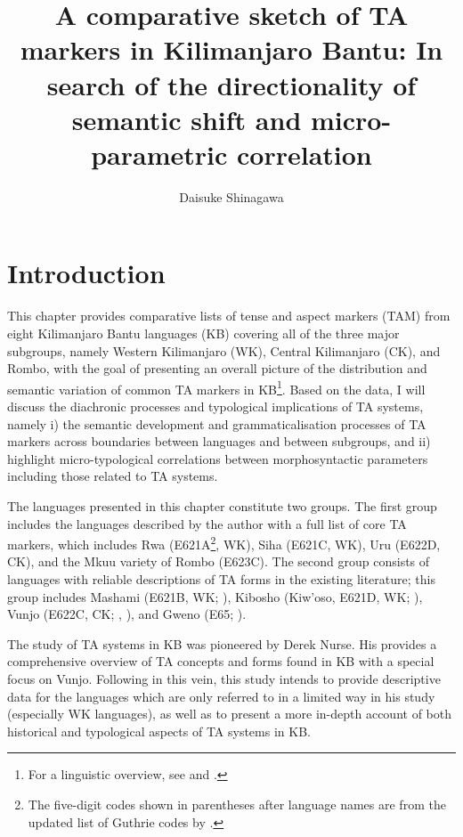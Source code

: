 \documentclass[output=paper]{langscibook}
\author{Daisuke Shinagawa\orcid{}\affiliation{ILCAA, Tokyo University of Foreign Studies}}
\title[A comparative sketch of TA markers in Kilimanjaro Bantu]{A comparative sketch of TA markers in Kilimanjaro Bantu: In search of the directionality of semantic shift and micro-parametric correlation}
\begin{document}
\maketitle 

\section{Introduction} %
\label{sec:shinagawa:1}

This chapter provides comparative lists of tense and aspect markers (TAM) from eight Kilimanjaro Bantu languages (KB) covering all of the three major subgroups, namely Western Kilimanjaro (WK), Central Kilimanjaro (CK), and Rombo, with the goal of presenting an overall picture of the distribution and semantic variation of common TA markers in KB\footnote{For a linguistic overview, see \citet{PhilippsonMontlahuc2003} and \citet{ShinagawaForthcoming-a}.}. Based on the data, I will discuss the diachronic processes and typological implications of TA systems, namely i) the semantic development and grammaticalisation processes of TA markers across boundaries between languages and between subgroups, and ii) highlight micro-typological correlations between morphosyntactic parameters including those related to TA systems.

The languages presented in this chapter constitute two groups. The first group includes the languages described by the author with a full list of core TA markers, which includes Rwa (E621A\footnote{The five-digit codes shown in parentheses after language names are from the updated list of Guthrie codes by \citet{Maho2009}.}, WK), Siha (E621C, WK), Uru (E622D, CK), and the Mkuu variety of Rombo (E623C). The second group consists of languages with reliable descriptions of TA forms in the existing literature; this group includes Mashami (E621B, WK; \citealt{RugemaliraPhanuel2012}), Kibosho (Kiw’oso, E621D, WK; \citealt{Kagaya1989}), Vunjo (E622C, CK; \citealt{Nurse2003a}, \citealt{Moshi1994}), and Gweno (E65; \citealt{PhilippsonNurse2000}).

The study of TA systems in KB was pioneered by Derek Nurse. His  \citep{Nurse2003a} provides a comprehensive overview of TA concepts and forms found in KB with a special focus on Vunjo. Following in this vein, this study intends to provide descriptive data for the languages which are only referred to in a limited way in his study (especially WK languages), as well as to present a more in-depth account of both historical and typological aspects of TA systems in KB.
\end{document}
